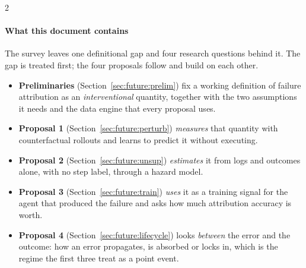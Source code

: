\begin{multicols}{2}
\paragraph{What this document contains} The survey leaves one definitional gap and four research questions behind it. The gap is treated first; the four proposals follow and build on each other.
\begin{itemize}[leftmargin=1.1em]
\item \textbf{Preliminaries} (Section~\ref{sec:future:prelim}) fix a working definition of failure attribution as an \emph{interventional} quantity, together with the two assumptions it needs and the data engine that every proposal uses.
\item \textbf{Proposal 1} (Section~\ref{sec:future:perturb}) \emph{measures} that quantity with counterfactual rollouts and learns to predict it without executing.
\item \textbf{Proposal 2} (Section~\ref{sec:future:unsup}) \emph{estimates} it from logs and outcomes alone, with no step label, through a hazard model.
\item \textbf{Proposal 3} (Section~\ref{sec:future:train}) \emph{uses} it as a training signal for the agent that produced the failure and asks how much attribution accuracy is worth.
\item \textbf{Proposal 4} (Section~\ref{sec:future:lifecycle}) looks \emph{between} the error and the outcome: how an error propagates, is absorbed or locks in, which is the regime the first three treat as a point event.
\end{itemize}


\end{multicols}
